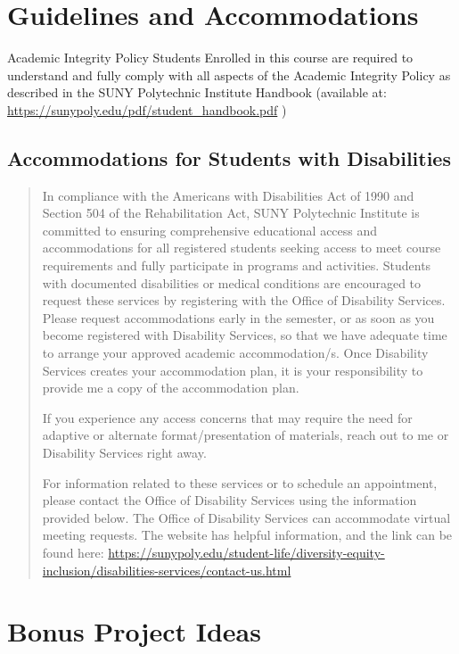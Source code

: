 \documentclass[11pt]{article}
\begin{document}
\section{Guidelines and Accommodations}
\label{sec:org2048377}

Academic Integrity Policy Students Enrolled in this course are required to understand and fully comply with all aspects of the Academic Integrity Policy as described in the SUNY Polytechnic Institute Handbook (available at:  \url{https://sunypoly.edu/pdf/student\_handbook.pdf} )
\subsection{Accommodations for Students with Disabilities}
\label{sec:org4ab2817}

\begin{quote}
In compliance with the Americans with Disabilities Act of 1990 and Section 504 of the Rehabilitation Act, SUNY Polytechnic Institute is committed to ensuring comprehensive educational access and accommodations for all registered students seeking access to meet course requirements and fully participate in programs and activities.  Students with documented disabilities or medical conditions are encouraged to request these services by registering with the Office of Disability Services. Please request accommodations early in the semester, or as soon as you become registered with Disability Services, so that we have adequate time to arrange your approved academic accommodation/s.  Once Disability Services creates your accommodation plan, it is your responsibility to provide me a copy of the accommodation plan.

If you experience any access concerns that may require the need for adaptive or alternate format/presentation of materials, reach out to me or Disability Services right away. 

For information related to these services or to schedule an appointment, please contact the Office of Disability Services using the information provided below.  The Office of Disability Services can accommodate virtual meeting requests.  The website has helpful information, and the link can be found here: \url{https://sunypoly.edu/student-life/diversity-equity-inclusion/disabilities-services/contact-us.html}
\end{quote}
\section{Bonus Project Ideas}
\label{sec:orga47a42b}
\end{document}
